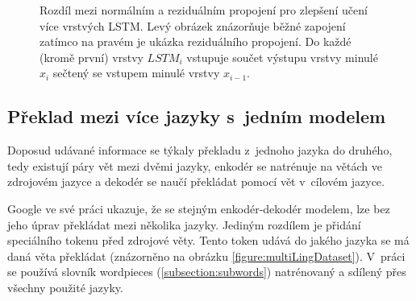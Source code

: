 \begin{figure}[H]
    \begin{center}
    \end{center}
	\caption{Rozdíl mezi normálním a reziduálním propojení pro zlepšení učení více vrstvých LSTM. Levý obrázek znázorňuje běžné zapojení zatímco na pravém je ukázka reziduálního propojení. Do každé (kromě první) vrstvy $LSTM_i$ vstupuje součet výstupu vrstvy minulé $x_i$ sečtený se vstupem minulé vrstvy $x_{i-1}$.}
	\label{img:residuals}
\end{figure}


\subsection{Překlad mezi více jazyky s~jedním modelem} \label{section:multilingual}
Doposud udávané informace se týkaly překladu z~jednoho jazyka do druhého, tedy existují páry vět mezi dvěmi jazyky, enkodér se natrénuje na větách ve zdrojovém jazyce a dekodér se naučí překládat pomocí vět v~cílovém jazyce.

Google ve své práci \cite{googleMultiLingual} ukazuje, že se stejným enkodér-dekodér modelem, lze bez jeho úprav překládat mezi několika jazyky.
Jediným rozdílem je přidání speciálního tokenu před zdrojové věty. Tento token udává do jakého jazyka se má daná věta překládat (znázorněno na obrázku \ref{figure:multiLingDataset}). V~práci se používá slovník wordpieces (\ref{subsection:subwords}) natrénovaný a sdílený přes všechny použité jazyky.



